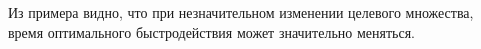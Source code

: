 \documentclass[10pt]{article}
\begin{document}
\begin{figure}[h]
    \centering
    \qquad
\end{figure}

Из примера видно, что при незначительном изменении целевого множества, время оптимального быстродействия может значительно меняться.
\newpage
\end{document}
